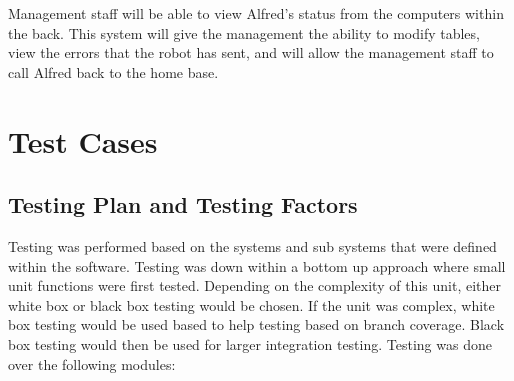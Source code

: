 \documentclass [10pt]{article}
\begin{document}
 Management staff will be able to view Alfred's status from the computers within the back. This system will give the management the ability to modify tables, view the errors that the robot has sent, and will allow the management staff to call Alfred back to the home base.

\section {Test Cases}

\subsection{Testing Plan and Testing Factors}
Testing was performed based on the systems and sub systems that were defined within the software. Testing was down within a bottom up approach where small unit functions were first tested. Depending on the complexity of this unit, either white box or black box testing would be chosen. If the unit was complex, white box testing would be used based to help testing based on branch coverage. Black box testing would then be used for larger integration testing. Testing was done over the following modules: \\
\end{document}
